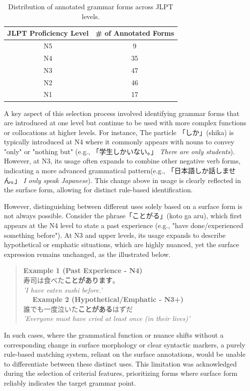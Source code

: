 \begin{table}[h!]
\centering
\begin{tabular}{cc}
\hline \textbf{JLPT Proficiency Level} & \textbf{\# of Annotated Forms} \\ \hline
N5 & 9 \\
N4  & 35 \\
N3 & 47\\
N2 & 46 \\
N1 & 17 \\
\hline
\end{tabular}
\caption[Table of Annotated Grammar forms across JLPT levels]{Distribution of annotated grammar forms across JLPT levels. }
\label{tab:CF-Counts}
\end{table}


A key aspect of this selection process involved identifying grammar forms that are introduced at one level but continue
to be used with more complex functions or collocations at higher levels. For instance, The particle 「しか」(shika) is
typically
introduced at N4 where it commonly appears with nouns to convey "only" or "nothing but" (e.g., 「学生しかいない。」
\textit{There are only students}). However, at N3, its usage often expands to combine other negative verb forms,
indicating a more advanced grammatical pattern(e.g., 「日本語しか話しません。」 \textit{I only speak Japanese}). This
change above in
usage is
clearly
reflected in the
surface
form, allowing for distinct rule-based identification.

However, distinguishing between different uses solely based on a surface form is not always possible. Consider the
phrase「ことがる」(koto ga aru),
which
first
appears at the N4 level to state a past experience (e.g., "have done/experienced something before"). At N3 and upper
levels, its usage expands to describe hypothetical or emphatic situations, which are highly nuanced, yet the surface
expression remains unchanged, as the illustrated below.

\begin{quote}
\textbf{Example 1 (Past Experience - N4)}\\
寿司は食べた\textbf{ことがあります}。\\
\textit{'I have eaten sushi before.'}\\　
\textbf{Example 2 (Hypothetical/Emphatic - N3+)}\\
誰でも一度泣いた\textbf{ことがある}はずだ\\
\textit{'Everyone must have cried at least once (in their lives)'}\\
\end{quote}
In such cases, where the grammatical function or nuance shifts without a corresponding change in surface morphology
or clear syntactic markers, a purely rule-based matching system, reliant on the surface annotations, would be unable to
differentiate between these distinct uses. This limitation was acknowledged during the
selection of criterial features, prioritizing forms where surface form reliably indicates the target grammar point.

